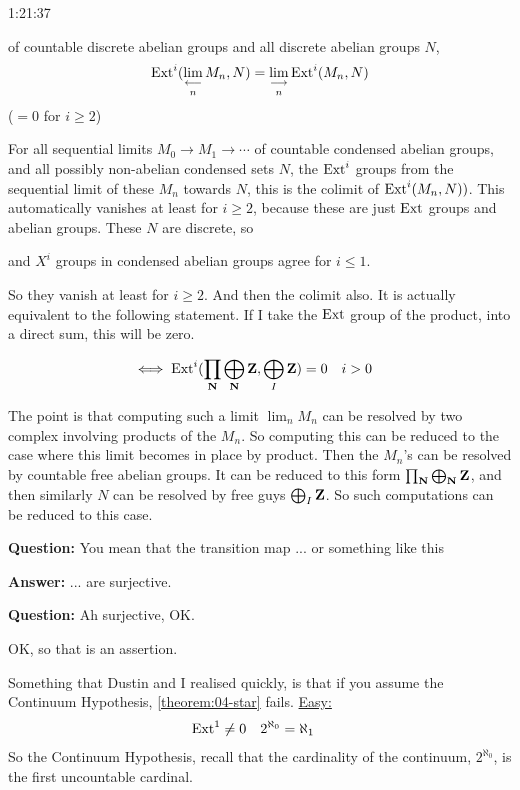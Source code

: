 \begin{unfinished}{1:21:37}
\begin{theorem}
of countable discrete abelian groups and all discrete abelian groups $N$, 
\begin{align*}
\operatorname{Ext}^i(\mathop{\operatorname*{lim}\limits_{\longleftarrow}}\limits_n M_n, N) = \mathop{\operatorname*{lim}\limits_{\longrightarrow}}\limits_n \operatorname{Ext}^i(M_n,N)
\end{align*}
($= 0$ for $i \geq 2$)

For all sequential limits $M_0 \to M_1 \to \cdots$ of countable condensed abelian groups, and all possibly non-abelian condensed sets $N$, the $\operatorname{Ext}^i$ groups from the sequential limit of these $M_n$ towards $N$, this is the colimit of $\operatorname{Ext}^i(M_n, N))$. 
This automatically vanishes at least for $i \geq 2$, because these are just $\operatorname{Ext}$ groups and abelian groups. These $N$ are discrete, so 



and $X^i$ groups in condensed abelian groups agree for $i \leq 1$. %

So they vanish at least for $i \geq 2$. 
And then the colimit also. 
It is actually equivalent to the following statement. If I take the $\operatorname{Ext}$ group of the product, into a direct sum, this will be zero.

\begin{align*}
\iff \operatorname{Ext}^i(\prod_\mathbf N \bigoplus_\mathbf N \mathbf Z, \bigoplus_I \mathbf Z) = 0 \quad & i > 0
\end{align*}

The point is that computing such a limit $\lim_n M_n$ can be resolved by two complex involving products of the $M_n$.
So computing this can be reduced to the case where this limit becomes in place by product. %
Then the $M_n$'s can be resolved by countable free abelian groups.
It can be reduced to this form $\prod_\mathbf N \bigoplus_\mathbf N \mathbf Z$, and then similarly $N$ can be resolved by free guys $\bigoplus_I \mathbf Z$.
So such computations can be reduced to this case.

\end{theorem}

\textbf{Question:} You mean that the transition map ...  or something like this

\textbf{Answer:} ... are surjective.

\textbf{Question:} Ah surjective, OK.

OK, so that is an assertion.

Something that Dustin and I realised quickly, is that if you assume the Continuum Hypothesis, \ref{theorem:04-star} fails.
\underline{Easy:}
\begin{align*}
\operatorname{Ext}^1 \neq 0 \quad & 2^{\aleph_0} = \aleph_1
\end{align*}
So the Continuum Hypothesis, recall that the cardinality of the continuum, $2^{\aleph_0}$, is the first uncountable cardinal.



\end{unfinished}
